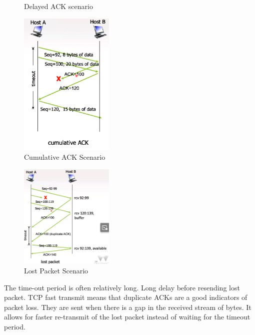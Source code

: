 \documentclass[a4paper]{article}
\theoremstyle{plain}
\theoremstyle{definition}
\newtheorem{defn}{Definition}[section]
\theoremstyle{remark}
\begin{document}
\begin{tcolorbox}[colback=black!3!white,colframe=black!60!white,breakable,enhanced,title=\begin{defn}TCP reliable data transfer \label{TCP reliable data transfer}\end{defn}]
\begin{figure}[H]
	\caption{Delayed ACK scenario}
	\label{fig:sixtytwo-png}
\end{figure}
\begin{figure}[H]
	\centering
	\includegraphics[width=0.4\textwidth]{sixtythree.png}
	\caption{Cumulative ACK Scenario}
	\label{fig:sixtythree-png}
\end{figure}
\begin{figure}[H]
	\centering
	\includegraphics[width=0.4\textwidth]{sixtyfour.png}
	\caption{Lost Packet Scenario}
	\label{fig:sixtyfour-png}
\end{figure}
The time-out period is often relatively long. Long delay before resending lost packet. TCP fast transmit means that duplicate ACKs are a good indicators of packet loss. They are sent when there is a gap in the received stream of bytes. It allows for faster re-transmit of the lost packet instead of waiting for the timeout period.
\end{tcolorbox}
\end{document}

